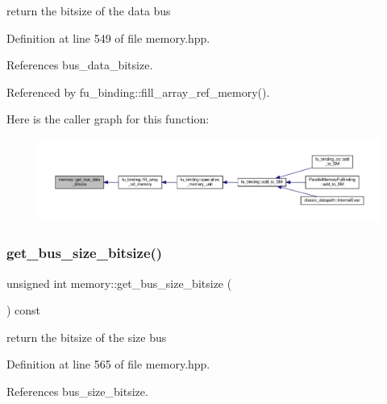 return the bitsize of the data bus 



Definition at line 549 of file memory.\+hpp.



References bus\+\_\+data\+\_\+bitsize.



Referenced by fu\+\_\+binding\+::fill\+\_\+array\+\_\+ref\+\_\+memory().

Here is the caller graph for this function\+:
\nopagebreak
\begin{figure}[H]
\begin{center}
\leavevmode
\includegraphics[width=350pt]{d8/d99/classmemory_a1db8e919be66e06ccc86dfce8fd40cec_icgraph}
\end{center}
\end{figure}
\mbox{\label{classmemory_ac4ef6ce89bf9d654aba58fdc92c9a098}} 
\subsubsection{\texorpdfstring{get\+\_\+bus\+\_\+size\+\_\+bitsize()}{get\_bus\_size\_bitsize()}}
{\footnotesize\ttfamily unsigned int memory\+::get\+\_\+bus\+\_\+size\+\_\+bitsize (\begin{DoxyParamCaption}{ }\end{DoxyParamCaption}) const\hspace{0.3cm}{\ttfamily [inline]}}



return the bitsize of the size bus 



Definition at line 565 of file memory.\+hpp.



References bus\+\_\+size\+\_\+bitsize.

\mbox{\label{classmemory_a3848f46ecf3925ab804f51e26661ae19}} 
